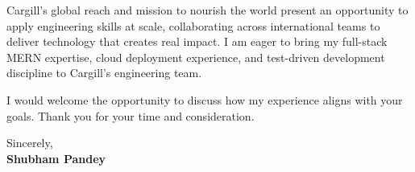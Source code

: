\documentclass[a4paper,11pt]{article}
\begin{document}
\vspace{8pt}
Cargill's global reach and mission to nourish the world present an opportunity to apply engineering skills at scale, collaborating across international teams to deliver technology that creates real impact. I am eager to bring my full-stack MERN expertise, cloud deployment experience, and test-driven development discipline to Cargill's engineering team.

\vspace{8pt}
I would welcome the opportunity to discuss how my experience aligns with your goals. Thank you for your time and consideration.

\vspace{16pt}
Sincerely,\\[4pt]
\textbf{Shubham Pandey}
\end{document}
